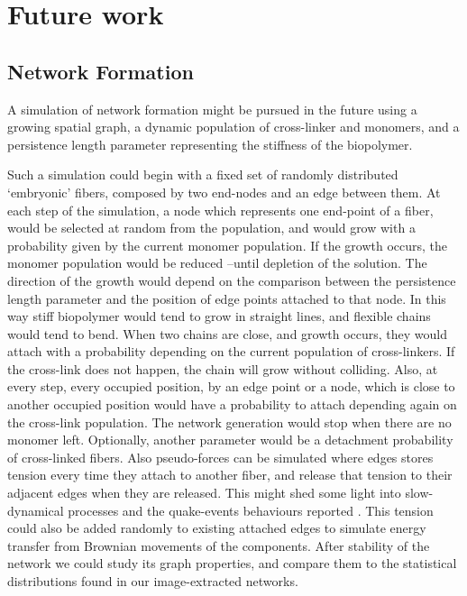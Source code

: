 \section{Future work}%
\label{sec:future_work}

\subsection{Network Formation}%
\label{sub:network_formation}

A simulation of network formation might be pursued in the future
  using a growing spatial graph, a dynamic population of cross-linker and monomers, and a persistence length parameter representing the stiffness of the biopolymer.

  Such a simulation could begin with a fixed set of randomly distributed `embryonic' fibers, composed by two end-nodes and an edge between them. At each step of the simulation, a node which represents one end-point of a fiber, would be selected at random from the population, and would grow with a probability given by the current monomer population. If the growth occurs, the monomer population would be reduced --until depletion of the solution. The direction of the growth would depend on the comparison between the persistence length parameter and the position of edge points attached to that node. In this way stiff biopolymer would tend to grow in straight lines, and flexible chains would tend to bend.
  When two chains are close, and growth occurs, they would attach with a probability depending on the current population of cross-linkers. If the cross-link does not happen, the chain will grow without colliding. Also, at every step, every occupied position, by an edge point or a node, which is close to another occupied position would have a probability to attach depending again on the cross-link population. The network generation would stop when there are no monomer left. Optionally, another parameter would be a detachment probability of cross-linked fibers. Also pseudo-forces can be simulated where edges stores tension every time they attach to another fiber, and release that tension to their adjacent edges when they are released. This might shed some light into slow-dynamical processes and the quake-events behaviours reported \cite{mansel_internal_2015}. This tension could also be added randomly to existing attached edges to simulate energy transfer from Brownian movements of the components. After stability of the network we could study its graph properties, and compare them to the statistical distributions found in our image-extracted networks.

